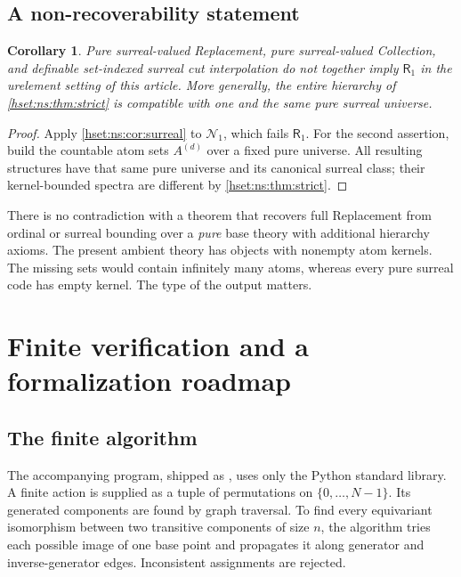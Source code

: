 \documentclass[11pt,letterpaper]{article}
\newtheorem{corollary}[corollary]{Corollary}\aliascntresetthe{corollary}
\theoremstyle{definition}
\theoremstyle{remark}
\begin{document}
\subsection{A non-recoverability statement}
\begin{corollary}\label{hset:ns:cor:invisible}
Pure surreal-valued Replacement, pure surreal-valued Collection, and definable set-indexed surreal cut interpolation do not together imply $\mathsf R_1$ in the urelement setting of this article. More generally, the entire hierarchy of \cref{hset:ns:thm:strict} is compatible with one and the same pure surreal universe.
\end{corollary}
\begin{proof}
Apply \cref{hset:ns:cor:surreal} to $\mathcal N_1$, which fails $\mathsf R_1$. For the second assertion, build the countable atom sets $A^{(d)}$ over a fixed pure universe. All resulting structures have that same pure universe and its canonical surreal class; their kernel-bounded spectra are different by \cref{hset:ns:thm:strict}.
\end{proof}

There is no contradiction with a theorem that recovers full Replacement from ordinal or surreal bounding over a \emph{pure} base theory with additional hierarchy axioms. The present ambient theory has objects with nonempty atom kernels. The missing sets would contain infinitely many atoms, whereas every pure surreal code has empty kernel. The type of the output matters.

\section{Finite verification and a formalization roadmap}
\label{hset:ns:sec:verification}

\subsection{The finite algorithm}
The accompanying program, shipped as , uses only the Python standard library. A finite action is supplied as a tuple of permutations on $\{0,\ldots,N-1\}$. Its generated components are found by graph traversal. To find every equivariant isomorphism between two transitive components of size $n$, the algorithm tries each possible image of one base point and propagates it along generator and inverse-generator edges. Inconsistent assignments are rejected.
\end{document}
